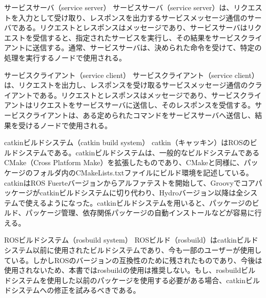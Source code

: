 
\begin{term}{サービスサーバ（service server）}
サービスサーバ（service server）は、リクエストを入力として受け取り、レスポンスを出力するサービスメッセージ通信のサーバである。リクエストとレスポンスはメッセージであり、サービスサーバはリクエストを受信すると、指定されたサービスを実行し、その結果をサービスクライアントに送信する。通常、サービスサーバは、決められた命令を受けて、特定の処理を実行するノードで使用される。
\end{term}


\begin{term}{サービスクライアント（service client）}
サービスクライアント（service client）は、リクエストを出力し、レスポンスを受け取るサービスメッセージ通信のクライアントである。リクエストとレスポンスはメッセージであり、サービスクライアントはリクエストをサービスサーバに送信し、そのレスポンスを受信する。サービスクライアントは、ある定められたコマンドをサービスサーバへ送信し、結果を受けるノードで使用される。
\end{term}


\begin{term}{catkinビルドシステム（catkin build system）}
catkin（キャッキン）はROSのビルドシステムである。catkinビルドシステムは、一般的なビルドシステムであるCMake（Cross Platform Make）を拡張したものであり、CMakeと同様に、パッケージのフォルダ内のCMakeLists.txtファイルにビルド環境を記述している。catkinはROS Fuerteバージョンからアルファテストを開始して、Groovyでコアパッケージがcatkinビルドシステムに切り代わり、Hydroバージョン以降は全システムで使えるようになった。catkinビルドシステムを用いると、パッケージのビルド、パッケージ管理、依存関係パッケージの自動インストールなどが容易に行える。
\end{term}


\begin{term}{ROSビルドシステム（rosbuild system）}
ROSビルド（rosbuild）はcatkinビルドシステム以前に使用されたビルドシステムであり、今も一部のユーザーが使用している。しかしROSのバージョンの互換性のために残されたものであり、今後は使用されないため、本書ではrosbuildの使用は推奨しない。もし、rosbuildビルドシステムを使用した以前のパッケージを使用する必要がある場合、catkinビルドシステムへの修正を試みるべきである。
\end{term}

